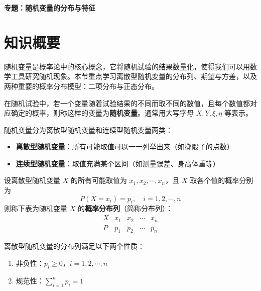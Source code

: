 \documentclass[11pt]{ctexrep}
\begin{document}
\begin{center}
    {\LARGE\bfseries 专题：随机变量的分布与特征}
\end{center}

\section*{知识概要}

随机变量是概率论中的核心概念，它将随机试验的结果数量化，使得我们可以用数学工具研究随机现象。本节重点学习离散型随机变量的分布列、期望与方差，以及两种重要的概率分布模型：二项分布与正态分布。

\begin{definition}[随机变量]
    在随机试验中，若一个变量随着试验结果的不同而取不同的数值，且每个数值都对应确定的概率，则称这样的变量为\textbf{随机变量}。通常用大写字母 $X, Y, \xi, \eta$ 等表示。
\end{definition}

随机变量分为离散型随机变量和连续型随机变量两类：
\begin{itemize}
    \item \textbf{离散型随机变量}：所有可能取值可以一一列举出来（如掷骰子的点数）
    \item \textbf{连续型随机变量}：取值充满某个区间（如测量误差、身高体重等）
\end{itemize}

\begin{definition}[离散型随机变量的分布列]
    设离散型随机变量 $X$ 的所有可能取值为 $x_1, x_2, \cdots, x_n$，且 $X$ 取各个值的概率分别为
    \[
        P(X = x_i) = p_i, \quad i = 1, 2, \cdots, n
    \]
    则称下表为随机变量 $X$ 的\textbf{概率分布列}（简称分布列）：
    \[
    \begin{array}{c|ccccc}
    X & x_1 & x_2 & \cdots & x_n \\ \hline
    P & p_1 & p_2 & \cdots & p_n
    \end{array}
    \]
\end{definition}

\begin{property}[分布列的性质]
    离散型随机变量的分布列满足以下两个性质：
    \begin{enumerate}
        \item 非负性：$p_i \ge 0$，$i = 1, 2, \cdots, n$
        \item 规范性：$\displaystyle\sum_{i=1}^{n} p_i = 1$
    \end{enumerate}
\end{property}
\end{document}
